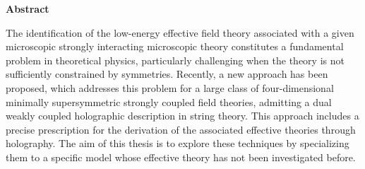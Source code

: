 




\thispagestyle{plain}
\begin{center}
    
    
    
    \textbf{Abstract}
\end{center}
The identification of the low-energy effective field theory associated with a given microscopic strongly interacting microscopic theory constitutes a fundamental problem in theoretical physics, particularly challenging when the theory is not sufficiently constrained by symmetries. Recently, a new approach has been proposed, which addresses this problem for a large class of four-dimensional minimally supersymmetric strongly coupled field theories, admitting a dual weakly coupled holographic description in string theory. This approach includes a precise prescription for the derivation of the associated effective theories through holography. The aim of this thesis is to explore these techniques by specializing them to a specific model whose effective theory has not been investigated before.
